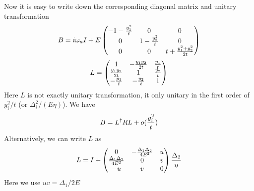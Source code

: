 Now it is easy to write down the corresponding diagonal matrix and unitary transformation
\begin{equation}
B=i\omega_{n}I+E\begin{pmatrix}-1-\frac{y_{1}^{2}}{t}&0&0\\0&1-\frac{y_{2}^{2}}{t}&0\\0&0&t+\frac{y_{1}^{2}+y_{2}^{2}}{2t}\end{pmatrix}
\end{equation}
\begin{equation}
L=\begin{pmatrix}1&-\frac{y_{1}y_{2}}{2t}&\frac{y_{1}}{t}\\\frac{y_{1}y_{2}}{2t}&1&\frac{y_{2}}{t}\\-\frac{y_{1}}{t}&-\frac{y_{2}}{t}&1\end{pmatrix}
\end{equation}
Here $L$ is not exactly unitary transformation, it only unitary in the first order of  $y_{i}^{2}/{t}$ (or $\Delta_{i}^{2}/(E\eta)$). We have 
\[
B=L^{\dagger}RL+o(\frac{y_{i}^{2}}{t})
\]
Alternatively, we can write $L$ as 
\begin{equation}
L=I+
\begin{pmatrix}0&-\frac{\Delta_{1}\Delta_{2}}{4E^{2}}&u\\
\frac{\Delta_{1}\Delta_{2}}{4E^{2}}&0&v\\
-u&v&0
\end{pmatrix}\frac{\Delta_{2}}{\eta}
\end{equation}
Here we use $uv=\Delta_{1}/2E$


